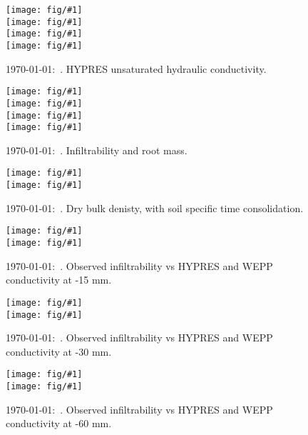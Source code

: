 \documentclass[a4paper]{article}
\newcommand{\figright}[1]{\texttt{[image: fig/\#1]}}
\newcommand{\figctop}[1]{\hspace*{-1cm}\figright{#1}}
\newcommand{\figc}[1]{\vspace*{-1.6cm}\figctop{#1}}
\newcommand{\MyID}{\today:~}
\begin{document}
\begin{figure}[htbp]
  \begin{center}
    \figctop{KM_L1} \\
    \figc{KM_L2} \\
    \figc{KM_L3} \\
    \figc{KM_L4}
  \end{center}
  \caption{\MyID{}. HYPRES unsaturated hydraulic conductivity.}
  \label{fig:KM}
\end{figure}

\begin{figure}[htbp]
  \begin{center}
    \figctop{K15_L1_root} \\
    \figc{K15_L2_root} \\
    \figc{K15_L3_root} \\
    \figc{K15_L4_root}
  \end{center}
  \caption{\MyID{}. Infiltrability and root mass.}
  \label{fig:K15root}
\end{figure}

\clearpage{}

\begin{figure}[htbp]
  \begin{center}
    \figctop{rho_b_S8} \\
    \figc{rho_b_S9}
  \end{center}
  \caption{\MyID{}. Dry bulk denisty, with soil specific time consolidation.}
  \label{fig:rho_b_S}
\end{figure}

\begin{figure}[htbp]
  \begin{center}
    \figctop{K15_S8} \\
    \figc{K15_S9}
  \end{center}
  \caption{\MyID{}. Observed infiltrability vs HYPRES and WEPP conductivity at -15 mm.}
  \label{fig:K15_S}
\end{figure}

\begin{figure}[htbp]
  \begin{center}
    \figctop{K30_S8} \\
    \figc{K30_S9}
  \end{center}
  \caption{\MyID{}. Observed infiltrability vs HYPRES and WEPP conductivity at -30 mm.}
  \label{fig:K30_S}
\end{figure}

\begin{figure}[htbp]
  \begin{center}
    \figctop{K60_S8} \\
    \figc{K60_S9}
  \end{center}
  \caption{\MyID{}. Observed infiltrability vs HYPRES and WEPP conductivity at -60 mm.}
  \label{fig:K60_S}
\end{figure}
\end{document}
